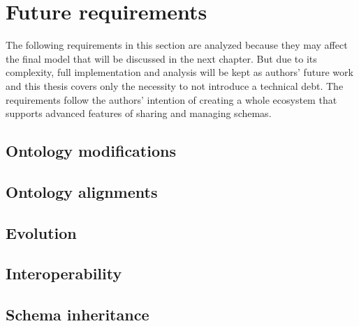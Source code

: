 





\chapter{Future requirements}\label{chapters:future-requirements}

The following requirements in this section are analyzed because they may affect the final model that will be discussed in the next chapter. But due to its complexity, full implementation and analysis will be kept as authors' future work and this thesis covers only the necessity to not introduce a technical debt. The requirements follow the authors' intention of creating a whole ecosystem that supports advanced features of sharing and managing schemas.

\section{Ontology modifications}


\section{Ontology alignments}


\section{Evolution}


\section{Interoperability}


\section{Schema inheritance}
